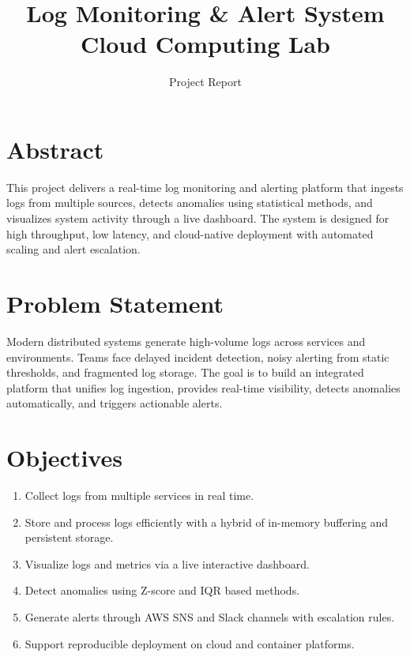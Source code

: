 \documentclass[11pt,a4paper]{article}
\title{Log Monitoring \& Alert System\\\large Cloud Computing Lab}
\author{Project Report}
\begin{document}
\maketitle
\tableofcontents
\newpage

\section{Abstract}
This project delivers a real-time log monitoring and alerting platform that ingests logs from multiple sources, detects anomalies using statistical methods, and visualizes system activity through a live dashboard. The system is designed for high throughput, low latency, and cloud-native deployment with automated scaling and alert escalation.

\section{Problem Statement}
Modern distributed systems generate high-volume logs across services and environments. Teams face delayed incident detection, noisy alerting from static thresholds, and fragmented log storage. The goal is to build an integrated platform that unifies log ingestion, provides real-time visibility, detects anomalies automatically, and triggers actionable alerts.

\section{Objectives}
\begin{enumerate}[label=\arabic*.]
  \item Collect logs from multiple services in real time.
  \item Store and process logs efficiently with a hybrid of in-memory buffering and persistent storage.
  \item Visualize logs and metrics via a live interactive dashboard.
  \item Detect anomalies using Z-score and IQR based methods.
  \item Generate alerts through AWS SNS and Slack channels with escalation rules.
  \item Support reproducible deployment on cloud and container platforms.
\end{enumerate}
\end{document}
